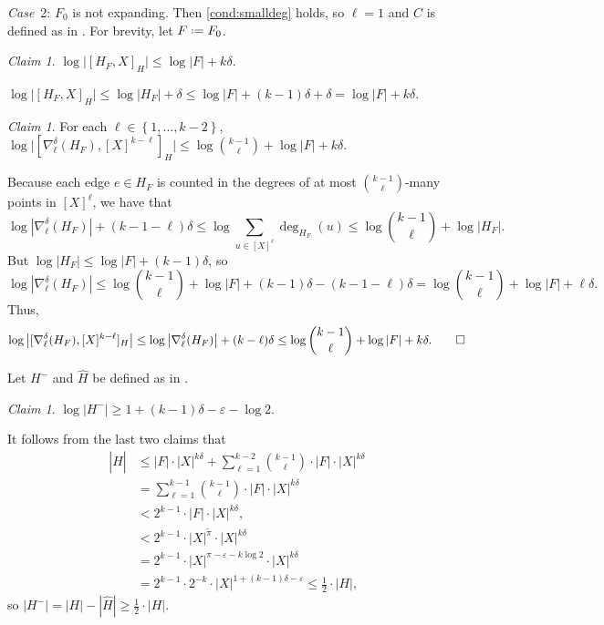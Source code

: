 \documentclass[12pt,reqno]{amsart}
\theoremstyle{plain}
\theoremstyle{definition}
\theoremstyle{remark}
\newtheorem{claim}[equation]{Claim}
\newenvironment{case}[2]{\smallskip\par\noindent \textit{Case}~#1: \rmfamily #2.}{}
\newcommand{\0}{\mathbb{\emptyset}}
\newcommand{\set}[1]{\left\{ #1 \right\}}
\newcommand*{\defeq}{\mathrel{\vcenter{\baselineskip0.5ex \lineskiplimit0pt \hbox{\scriptsize.}\hbox{\scriptsize.}}}=}
\newcommand{\de}{\delta}
\newcommand{\e}{\varepsilon}
\begin{document}
\begin{case}{2}{$F_0$ is not expanding}
	Then \cref{cond:smalldeg} holds, so $\ell = 1$ and $C$ is defined as in . For brevity, let $F \defeq F_0$.
	
	\begin{claim}
		$\log\big|[H_F, X]_H\big| \le \log|F| + k \de$.
	\end{claim}
	\begin{pf}
		$
		\log\big|[H_F, X]_H\big| 
		\le 
		\log|H_F| + \de
		\le
		\log|F| + (k-1) \de + \de
		= 
		\log|F| + k \de.
		$
	\end{pf}
	
	\begin{claim}
		For each $\ell \in \set{1, \hdots, k-2}$, $\log\big|[\nabla_\ell^{\de}(H_F), [X]^{k-\ell}]_H\big| \le \log{k-1 \choose \ell} + \log|F| + k \de$.
	\end{claim}
	\begin{pf}
		Because each edge $e \in H_F$ is counted in the degrees of at most ${k - 1 \choose \ell}$-many points in $[X]^\ell$, we have that
		\[
		\log|\nabla_\ell^{\de}(H_F)| + (k - 1 - \ell) \de \le \log \sum_{u \in [X]^\ell} \deg_{H_F}(u) \le \log {k - 1 \choose \ell} + \log |H_F|.
		\]
		But $\log |H_F| \le \log|F| + (k - 1) \de$, so
		\[
		\log |\nabla_\ell^{\de}(H_F)| 
		\le 
		\log{k-1 \choose \ell} + \log |F| + (k-1) \de - (k - 1 - \ell) \de 
		= 
		\log{k-1 \choose \ell} + \log |F| + \ell \de.
		\]
		Thus,
		\[
		\log\big|[\nabla_\ell^{\de}(H_F), [X]^{k-\ell}]_H\big|
		\le 
		\log \big|\nabla_\ell^{\de} (H_F)\big| + (k - \ell) \de
		\le 
		\log{k-1 \choose \ell} + \log |F| + k \de.
		\qedhere
		\]
	\end{pf}
	
	Let $H^-$ and $\hat{H}$ be defined as in .
	\begin{claim}\label{claim:finite:H^-_is_large}
		$\log|H^-| \ge 1 + (k-1) \de - \e - \log 2$.
	\end{claim}
	\begin{pf}
		It follows from the last two claims that
		\begin{align*}
		|\hat{H}| 
		&\le 
		|F| \cdot |X|^{k \de} + \sum_{\ell = 1}^{k-2} {k-1 \choose \ell} \cdot |F| \cdot |X|^{k \de}
		\\
		&=
		\sum_{\ell = 1}^{k-1} {k-1 \choose \ell} \cdot |F| \cdot |X|^{k \de} 
		\\
		&< 
		2^{k-1} \cdot |F| \cdot |X|^{k \de},
		\\
		&<
		2^{k-1} \cdot |X|^{\tilde\pi} \cdot |X|^{k \de}
		\\
		&=
		2^{k-1} \cdot |X|^{\pi-\e-k\log 2} \cdot |X|^{k \de}
		\\
		&=
		2^{k-1} \cdot 2^{-k} \cdot |X|^{1 + (k-1) \de - \e}
		\leq
		\frac{1}{2} \cdot |H|,
		\end{align*}
		so $|H^-| = |H| - |\hat{H}| \ge \frac{1}{2} \cdot |H|$.
	\end{pf}
	

\end{case}
\end{document}
